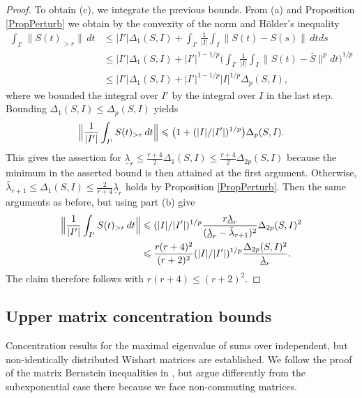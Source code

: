 \documentclass[preprint,aos]{imsart}
\numberwithin{equation}{section}
\theoremstyle{remark}
\providecommand{\abs}[1]{\lvert #1 \rvert}
\providecommand{\norm}[1]{\lVert #1 \rVert}
\providecommand{\bnorm}[1]{{\Bigl\lVert #1 \Bigr\rVert}}
\renewcommand{\le}{\leqslant}
\begin{document}
\begin{appendix}
\begin{proof}
To obtain (c), we integrate the previous bounds. From (a) and Proposition \ref{PropPerturb} we obtain  by the convexity of the norm and H\"older's inequality
\begin{align*}
\int_{I'}\norm{S(t)_{>r}}\,dt &\le \abs{I'}\Delta_1(S,I)+\int_{I'}\frac1{\abs{I}}\int_I \norm{S(t)-S(s)}\,dtds\\
&\le \abs{I'}\Delta_1(S,I)+\abs{I'}^{1-1/p}\Big(\int_{I'}\frac1{\abs{I}}\int_I \norm{S(t)-\bar S}^pdt\Big)^{1/p}\\
&\le \abs{I'}\Delta_1(S,I)+\abs{I'}^{1-1/p}\abs{I}^{1/p}\Delta_p(S,I),
\end{align*}
where we bounded the integral over $I'$ by the integral over $I$ in the last step. Bounding $\Delta_1(S,I)\le \Delta_p(S,I)$ yields
\[ \bnorm{\frac1{\abs{I'}}\int_{I'}S(t)_{>r}\,dt} \le \big(1+(\abs{I}/\abs{I'})^{1/p}\big)\Delta_p(S,I).\]
This gives the assertion for $\underline\lambda_r\le \frac{r+4}{2}\Delta_1(S,I)\le \frac{r+4}{2}\Delta_{2p}(S,I)$ because the minimum in the asserted bound is then attained at the first argument. Otherwise, $\bar\lambda_{r+1}\le \Delta_1(S,I)\le \frac2{r+4}\underline\lambda_r$ holds by Proposition \ref{PropPerturb}. Then the same arguments as before, but using part (b) give
\begin{align*}
\bnorm{\frac1{\abs{I'}}\int_{I'}S(t)_{>r}\,dt }
&\le (\abs{I}/\abs{I'})^{1/p}\frac{r\underline\lambda_r }{(\underline\lambda_r-\bar\lambda_{r+1})^2}\Delta_{2p}(S,I)^2\\
&\le \frac{r(r+4)^2}{(r+2)^2}(\abs{I}/\abs{I'})^{1/p}\frac{\Delta_{2p}(S,I)^2}{\underline\lambda_r}.
\end{align*}
The claim therefore follows with $r(r+4)\le (r+2)^2$.
\end{proof}

\subsection{Upper matrix concentration bounds}

Concentration results for the maximal eigenvalue of sums over independent, but non-identically distributed Wishart matrices are established. We follow the proof of the matrix Bernstein inequalities in \citet{tropp2012}, but argue differently from the subexponential case there because we face non-commuting matrices.


\end{appendix}
\end{document}
